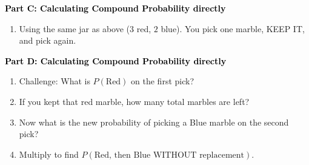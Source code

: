 \documentclass[12pt, letterpaper, fleqn]{article}
\newcommand{\blank}{\underline{\hspace{2.2cm}}}
\begin{document}
\begin{tcolorbox}[colback=customteal!20]
\large\textcolor{black}{\textbf{Part C: Calculating Compound Probability directly}}
\end{tcolorbox}

\vspace{3mm}

\begin{enumerate}[itemsep=5.5cm, leftmargin=0.6cm, resume]
\begin{itemize}
\item What is $P(\text{Blue})$ on the second pick? \blank
\item What is $P(\text{Red, then Blue})$? \blank
\end{itemize}
\item Using the same jar as above ($3$ red, $2$ blue). You pick one marble, KEEP IT, and pick again.
\end{enumerate}

\newpage

\begin{tcolorbox}[colback=customteal!20]
\large\textcolor{black}{\textbf{Part D: Calculating Compound Probability directly}}
\end{tcolorbox}

\vspace{3mm}

\begin{enumerate}[itemsep=5.5cm, leftmargin=0.6cm, resume]
\item Challenge: What is $P(\text{Red})$ on the first pick? \blank
\item If you kept that red marble, how many total marbles are left? \blank
\item Now what is the new probability of picking a Blue marble on the second pick? \blank
\item Multiply to find $P(\text{Red, then Blue WITHOUT replacement})$. \blank
\end{enumerate}
\end{document}
